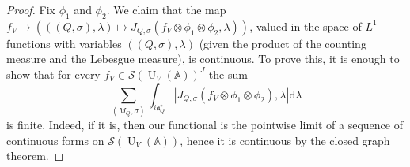 \documentclass[letterpaper,11pt]{amsart}
\newcommand{\bA}{\mathbb{A}}
\newcommand{\cS}{\mathcal{S}}
\newcommand{\rd}{\mathrm{d}}
\newcommand{\<}{\negthickspace}
\newcommand{\valP}[1]{\left|#1\right|}
\DeclareMathOperator{\U}{U}
\theoremstyle{definition}
\theoremstyle{plain}
\theoremstyle{remark}
\numberwithin{equation}{section}
\begin{document}
\begin{proof}
Fix $\phi_1$ and $\phi_2$. We claim that the map $f_V \mapsto \left( ((Q,\sigma),\lambda) \mapsto J_{Q,\sigma}(f_V\otimes\phi_1\otimes\phi_2,\lambda) \right)$, valued in the space of $L^1$ functions with variables $((Q,\sigma),\lambda)$ (given the product of the counting measure and the Lebesgue measure), is continuous. To prove this, it is enough to show that for every $f_V \in \cS(\U_V(\bA))^J$ the sum 
\begin{equation}
\label{eq:selberg_trick_0}
    \sum_{(M_Q,\sigma)} \int_{ i \mathfrak{a}_Q^*}
    \valP{J_{Q,\sigma}(f_V \otimes \phi_1 \otimes \phi_2),\lambda} \rd \lambda
\end{equation}
is finite. Indeed, if it is, then our functional is the pointwise limit of a sequence of continuous forms on $\cS(\U_V(\bA))$, hence it is continuous by the closed graph theorem. 


\end{proof}
\end{document}
